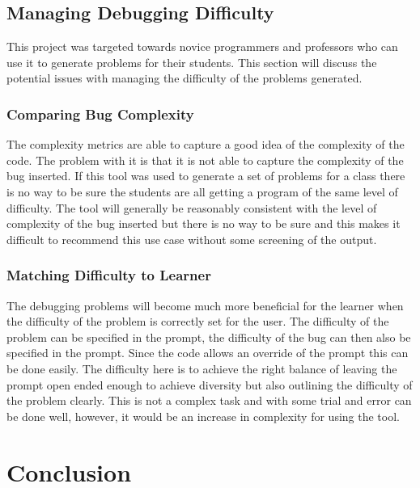 \documentclass[12pt]{extarticle}
\begin{document}
\subsection{Managing Debugging Difficulty}

This project was targeted towards novice programmers and professors who can use it to generate problems for their students. This section will discuss the potential issues with managing the difficulty of the problems generated.

\subsubsection{Comparing Bug Complexity}

The complexity metrics are able to capture a good idea of the complexity of the code. The problem with it is that it is not able to capture the complexity of the bug inserted. If this tool was used to generate a set of problems for a class there is no way to be sure the students are all getting a program of the same level of difficulty. The tool will generally be reasonably consistent with the level of complexity of the bug inserted but there is no way to be sure and this makes it difficult to recommend this use case without some screening of the output.

\subsubsection{Matching Difficulty to Learner}

The debugging problems will become much more beneficial for the learner when the difficulty of the problem is correctly set for the user. The difficulty of the problem can be specified in the prompt, the difficulty of the bug can then also be specified in the prompt. Since the code allows an override of the prompt this can be done easily. The difficulty here is to achieve the right balance of leaving the prompt open ended enough to achieve diversity but also outlining the difficulty of the problem clearly. This is not a complex task and with some trial and error can be done well, however, it would be an increase in complexity for using the tool.


\newpage
\section{Conclusion}
\end{document}
